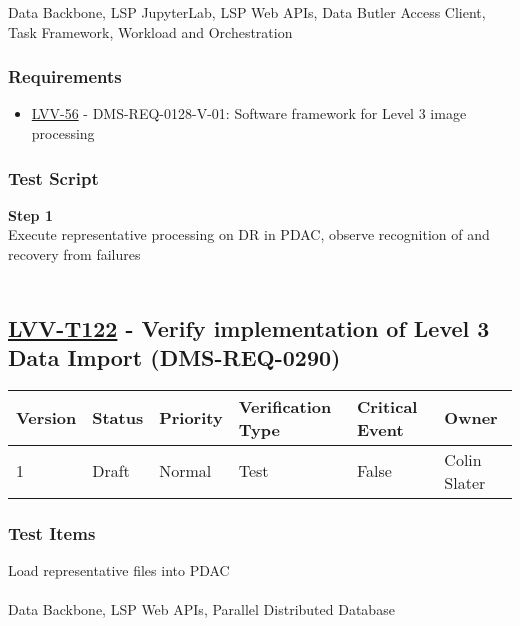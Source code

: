 Data Backbone, LSP JupyterLab, LSP Web APIs, Data Butler Access Client,
Task Framework, Workload and Orchestration

\hypertarget{requirements-98}{%
\subsubsection{Requirements}\label{requirements-98}}

\begin{itemize}
\tightlist
\item
  \href{https://jira.lsstcorp.org/browse/LVV-56}{LVV-56} -
  DMS-REQ-0128-V-01: Software framework for Level 3 image processing
\end{itemize}

\hypertarget{test-script-98}{%
\subsubsection{Test Script}\label{test-script-98}}

\textbf{Step 1}\\
Execute representative processing on DR in PDAC, observe recognition of
and recovery from failures\\
~\\

\hypertarget{lvv-t122---verify-implementation-of-level-3-data-import-dms-req-0290}{%
\subsection{\texorpdfstring{\href{https://jira.lsstcorp.org/secure/Tests.jspa\#/testCase/LVV-T122}{LVV-T122}
- Verify implementation of Level 3 Data Import
(DMS-REQ-0290)}{LVV-T122 - Verify implementation of Level 3 Data Import (DMS-REQ-0290)}}\label{lvv-t122---verify-implementation-of-level-3-data-import-dms-req-0290}}

\begin{longtable}[]{@{}llllll@{}}
\toprule
Version & Status & Priority & Verification Type & Critical Event &
Owner\tabularnewline
\midrule
\endhead
1 & Draft & Normal & Test & False & Colin Slater\tabularnewline
\bottomrule
\end{longtable}

\hypertarget{test-items-98}{%
\subsubsection{Test Items}\label{test-items-98}}

Load representative files into PDAC\\
~\\
Data Backbone, LSP Web APIs, Parallel Distributed Database

